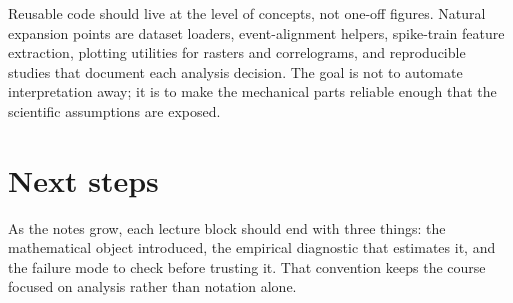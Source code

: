 Reusable code should live at the level of concepts, not one-off figures. Natural expansion points are dataset loaders, event-alignment helpers, spike-train feature extraction, plotting utilities for rasters and correlograms, and reproducible studies that document each analysis decision. The goal is not to automate interpretation away; it is to make the mechanical parts reliable enough that the scientific assumptions are exposed.

\section{Next steps}

As the notes grow, each lecture block should end with three things: the mathematical object introduced, the empirical diagnostic that estimates it, and the failure mode to check before trusting it. That convention keeps the course focused on analysis rather than notation alone.
